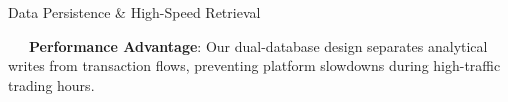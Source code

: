 \documentclass{beamer}
\begin{document}
\begin{frame}{Data Persistence \& High-Speed Retrieval}
\vspace{0.15cm}
\begin{tcolorbox}[enhanced, colback=primaryblue!4, colframe=primaryblue!30, boxrule=0.35pt,
  arc=3.5pt, width=0.98\textwidth, left=4pt, right=4pt, top=2.5pt, bottom=2.5pt, boxsep=0pt,
  halign=center, shadow={0.5pt}{-0.5pt}{0pt}{black!8}]
    \fontsize{5.5pt}{6.5pt}\selectfont
    \textcolor{primaryDark}{~~~\textbf{Performance Advantage}: Our dual-database design separates analytical writes from transaction flows, preventing platform slowdowns during high-traffic trading hours.}
\end{tcolorbox}
\end{frame}

\end{document}
